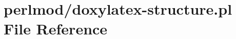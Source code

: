 \hypertarget{doxylatex-structure_8pl}{\section{perlmod/doxylatex-\/structure.pl File Reference}
\label{doxylatex-structure_8pl}
}

